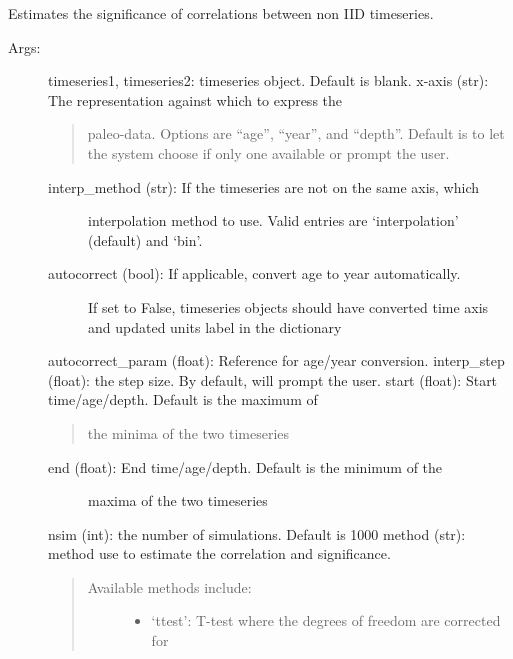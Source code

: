 \documentclass[letterpaper,10pt,english]{sphinxmanual}
\begin{document}
\begin{fulllineitems}
\label{\detokenize{Main:pyleoclim.corrSigTs}}
Estimates the significance of correlations between non IID timeseries.
\begin{description}
\item[{Args:}] \leavevmode
timeseries1, timeseries2: timeseries object. Default is blank.
x-axis (str): The representation against which to express the
\begin{quote}

paleo-data. Options are “age”, “year”, and “depth”.
Default is to let the system choose if only one available
or prompt the user.
\end{quote}
\begin{description}
\item[{interp\_method (str): If the timeseries are not on the same axis, which}] \leavevmode
interpolation method to use. Valid entries are ‘interpolation’
(default) and ‘bin’.

\item[{autocorrect (bool): If applicable, convert age to year automatically.}] \leavevmode
If set to False, timeseries objects should have converted time
axis and updated units label in the dictionary

\end{description}

autocorrect\_param (float): Reference for age/year conversion.
interp\_step (float): the step size. By default, will prompt the user.
start (float): Start time/age/depth. Default is the maximum of
\begin{quote}

the minima of the two timeseries
\end{quote}
\begin{description}
\item[{end (float): End time/age/depth. Default is the minimum of the}] \leavevmode
maxima of the two timeseries

\end{description}

nsim (int): the number of simulations. Default is 1000
method (str): method use to estimate the correlation and significance.
\begin{quote}
\begin{description}
\item[{Available methods include:}] \leavevmode\begin{itemize}
\item {} 
‘ttest’: T-test where the degrees of freedom are corrected for


\end{itemize}
\end{description}
\end{quote}
\end{description}
\end{fulllineitems}
\end{document}
